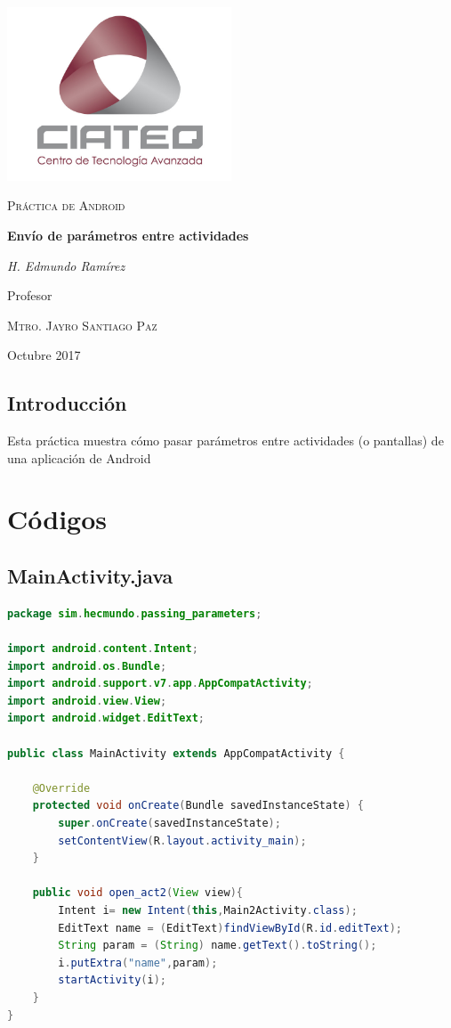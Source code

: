 \documentclass{report}
\begin{document}

\begin{titlepage}

	\centering
	\includegraphics[width=0.5\textwidth]{../images/ciateq.jpg}\par\vspace{1cm}
	\vspace{1cm}
	{\scshape\Large Pr\'{a}ctica de Android\par}
	\vspace{1.5cm}
	{\huge\bfseries Env\'{i}o de par\'{a}metros entre actividades\par}
	\vspace{2cm}
	{\Large\itshape H. Edmundo Ram\'{i}rez\par}
	\vfill
	Profesor\par
	\textsc{Mtro. Jayro Santiago Paz}
	\vfill

	{\large \date sOctubre 2017\par}
\end{titlepage}

\section{Introducci\'{o}n}
Esta pr\'{a}ctica muestra c\'{o}mo pasar parámetros entre actividades (o pantallas) de una aplicaci\'{o}n de Android

\chapter{C\'{o}digos}
\section{MainActivity.java}
\begin{lstlisting}[language=java]
package sim.hecmundo.passing_parameters;

import android.content.Intent;
import android.os.Bundle;
import android.support.v7.app.AppCompatActivity;
import android.view.View;
import android.widget.EditText;

public class MainActivity extends AppCompatActivity {

    @Override
    protected void onCreate(Bundle savedInstanceState) {
        super.onCreate(savedInstanceState);
        setContentView(R.layout.activity_main);
    }

    public void open_act2(View view){
        Intent i= new Intent(this,Main2Activity.class);
        EditText name = (EditText)findViewById(R.id.editText);
        String param = (String) name.getText().toString();
        i.putExtra("name",param);
        startActivity(i);
    }
}
\end{lstlisting}	
\end{document}
